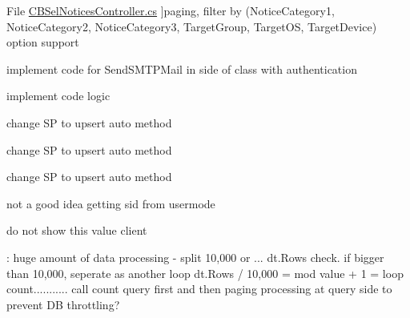 \begin{DoxyRefList}
\hypertarget{a00001__todo000015}{}%
File \hyperlink{a00151}{C\+B\+Sel\+Notices\+Controller.cs} ]paging, filter by (Notice\+Category1, Notice\+Category2, Notice\+Category3, Target\+Group, Target\+OS, Target\+Device) option support  
\item[\label{a00001__todo000016}%
\hypertarget{a00001__todo000016}{}%
File \hyperlink{a00152}{C\+B\+Sel\+Send\+Email\+To\+Member\+Controller.cs} ]implement code for Send\+S\+M\+T\+P\+Mail in side of class with authentication  
\item[\label{a00001__todo000019}%
\hypertarget{a00001__todo000019}{}%
File \hyperlink{a00155}{C\+B\+Udt\+Confirmed\+Email\+Address\+Controller.cs} ]implement code logic  
\item[\label{a00001__todo000020}%
\hypertarget{a00001__todo000020}{}%
File \hyperlink{a00156}{C\+B\+Udt\+Coupon\+Member\+Controller.cs} ]change SP to upsert auto method  
\item[\label{a00001__todo000021}%
\hypertarget{a00001__todo000021}{}%
File \hyperlink{a00157}{C\+B\+Udt\+Game\+Event\+Member\+To\+Item\+Controller.cs} ]change SP to upsert auto method  
\item[\label{a00001__todo000022}%
\hypertarget{a00001__todo000022}{}%
File \hyperlink{a00159}{C\+B\+Udt\+Move\+Gift\+Controller.cs} ]change SP to upsert auto method  
\item[\label{a00001__todo000010}%
\hypertarget{a00001__todo000010}{}%
Member \hyperlink{a00029_a92ec1412458c02b686672a2cdc031fd6}{Cloud\+Bread.Controllers.C\+B\+Rank\+Controller.G\+ET} (string sid, long start\+Rank, long end\+Rank)]not a good idea getting sid from usermode  
\item[\label{a00001__todo000017}%
\hypertarget{a00001__todo000017}{}%
Member \hyperlink{a00082_a8578f804b87fd27135c1d3f4712aa7e0}{Cloud\+Bread.Controllers.C\+B\+Socket\+Auth\+Controller.Payload.gen\+Date\+U\+TC} ]do not show this value client  
\item[\label{a00001__todo000002}%
\hypertarget{a00001__todo000002}{}%
Member \hyperlink{a00030_a8227a017bb2cf72e82c0540aec88f66f}{Cloud\+Bread\+Redis.C\+B\+Redis.Fill\+All\+Rank\+From\+DB} ()]\+: huge amount of data processing -\/ split 10,000 or ... dt.\+Rows check. if bigger than 10,000, seperate as another loop dt.\+Rows / 10,000 = mod value + 1 = loop count........... call count query first and then paging processing at query side to prevent DB throttling? 
\end{DoxyRefList}